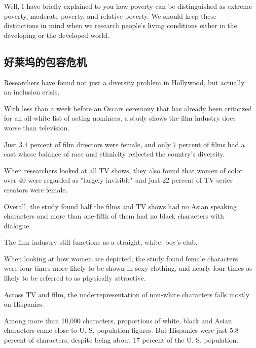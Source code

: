 Well, I have briefly explained to you how poverty can be distinguished as extreme poverty, moderate poverty, and relative poverty. We should keep these distinctions in mind when we research people's living conditions either in the developing or the developed world.

\subsection{好莱坞的包容危机}
Researchers have found not just a diversity problem in Hollywood, but actually an inclusion crisis.

With less than a week before an Oscars ceremony that has already been criticized for an all-white list of acting nominees, a study shows the film industry does worse than television.

Just 3.4 percent of film directors were female, and only 7 percent of films had a cast whose balance of race and ethnicity reflected the country's diversity.

When researchers looked at all TV shows, they also found that women of color over 40 were regarded as "largely invisible" and just 22 percent of TV series creators were female.

Overall, the study found half the films and TV shows had no Asian speaking characters and more than one-fifth of them had no black characters with dialogue.

The film industry still functions as a straight, white, boy's club.

When looking at how women are depicted, the study found female characters were four times more likely to be shown in sexy clothing, and nearly four times as likely to be referred to as physically attractive.

Across TV and film, the underrepresentation of non-white characters falls mostly on Hispanics.

Among more than 10,000 characters, proportions of white, black and Asian characters came close to U. S. population figures. But Hispanics were just 5.8 percent of characters, despite being about 17 percent of the U. S. population.